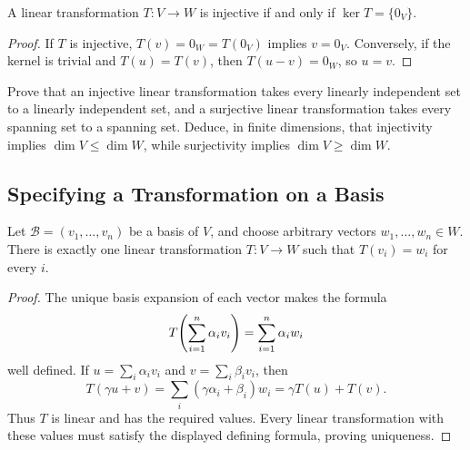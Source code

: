\begin{Theorem}\label{thm:InjectiveKernel}
A linear transformation $T\colon V\to W$ is injective if and only if $\ker T=\{0_V\}$.
\end{Theorem}
\begin{proof}
If $T$ is injective, $T(v)=0_W=T(0_V)$ implies $v=0_V$. Conversely, if the kernel is trivial and $T(u)=T(v)$, then $T(u-v)=0_W$, so $u=v$.
\end{proof}

\begin{Exercise}
Prove that an injective linear transformation takes every linearly independent set to a linearly independent set, and a surjective linear transformation takes every spanning set to a spanning set. Deduce, in finite dimensions, that injectivity implies $\dim V\le\dim W$, while surjectivity implies $\dim V\ge\dim W$.
\end{Exercise}

\subsection{Specifying a Transformation on a Basis}

\begin{Theorem}\label{thm:SpecifyBasis}
Let $\mathcal B=(v_1,\ldots,v_n)$ be a basis of $V$, and choose arbitrary vectors $w_1,\ldots,w_n\in W$. There is exactly one linear transformation $T\colon V\to W$ such that $T(v_i)=w_i$ for every $i$.
\end{Theorem}
\begin{proof}
The unique basis expansion of each vector makes the formula
\begin{equation*}
T\pqty{\sum_{i=1}^n\alpha_iv_i}=\sum_{i=1}^n\alpha_iw_i
\end{equation*}
well defined. If $u=\sum_i\alpha_iv_i$ and $v=\sum_i\beta_iv_i$, then
\begin{equation*}
T(\gamma u+v)=\sum_i(\gamma\alpha_i+\beta_i)w_i=\gamma T(u)+T(v).
\end{equation*}
Thus $T$ is linear and has the required values. Every linear transformation with these values must satisfy the displayed defining formula, proving uniqueness.
\end{proof}


